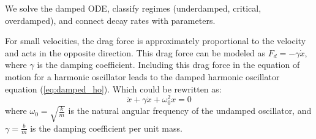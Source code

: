 \documentclass[11pt]{report}
\begin{document}
We solve the damped ODE, classify regimes (underdamped, critical, overdamped), and connect decay rates with parameters.
\begin{definition}
    For small velocities, the drag force is approximately proportional to the velocity and acts in the opposite direction. This drag force can be modeled as \( F_d = -\gamma \dot{x} \), where \( \gamma \) is the damping coefficient. Including this drag force in the equation of motion for a harmonic oscillator leads to the damped harmonic oscillator equation (\ref{eq:damped_ho}). Which could be rewritten as:
    \begin{equation}\label{eq:damped_ode}
        \ddot{x} + \gamma \dot{x} + \omega_0^2 x = 0
    \end{equation}
    where \( \omega_0 = \sqrt{\frac{k}{m}} \) is the natural angular frequency of the undamped oscillator, and \( \gamma = \frac{b}{m} \) is the damping coefficient per unit mass.
    

\end{definition}
\end{document}
